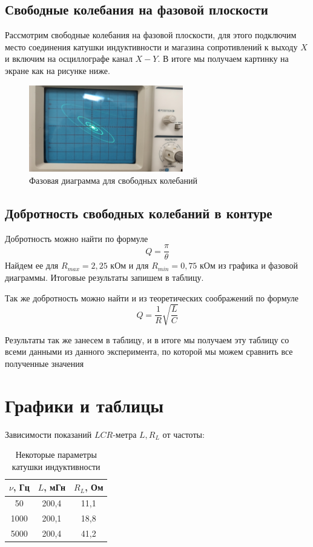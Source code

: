 \documentclass[a4paper, 12pt]{article}%
\begin{document}
\newpage
\subsection{Свободные колебания на фазовой плоскости}
Рассмотрим свободные колебания на фазовой плоскости, для этого подключим место соединения катушки индуктивности и магазина сопротивлений к выходу $X$ и включим на осциллографе канал $X-Y$. В итоге мы получаем картинку на экране как на рисунке ниже. 
\begin{figure}[h!]
\begin{center}
\includegraphics[width = 0.6\textwidth]{my3.jpg}
\caption{Фазовая диаграмма для свободных колебаний}
\end{center}
\end{figure}

\subsection{Добротность свободных колебаний в контуре}
Добротность можно найти по формуле 
\[Q = \dfrac{\pi}{\theta}\]
Найдем ее для $R_{max} = 2,25$ кОм и для $R_{min} = 0,75$ кОм из графика и фазовой диаграммы. Итоговые результаты запишем в таблицу.

Так же добротность можно найти и из теоретических соображений по формуле
\[Q = \dfrac{1}{R}\sqrt{\dfrac{L}{C}}\]

Результаты так же занесем в таблицу, и в итоге мы получаем эту таблицу со всеми данными из данного эксперимента, по которой мы можем сравнить все полученные значения

\section{Графики и таблицы}

Зависимости показаний $LCR$-метра $L, R_L$ от частоты:   

\begin{table}[h!]
\begin{center}
\begin{tabular}{|c|c|c|}
\hline
$\nu$, Гц & $L$, мГн & $R_L$, Ом \\ \hline
50        & 200,4    & 11,1      \\ \hline
1000      & 200,1    & 18,8      \\ \hline
5000      & 200,4    & 41,2      \\ \hline
\end{tabular}
\caption{Некоторые параметры катушки индуктивности}
\end{center}
\end{table}
\end{document}
